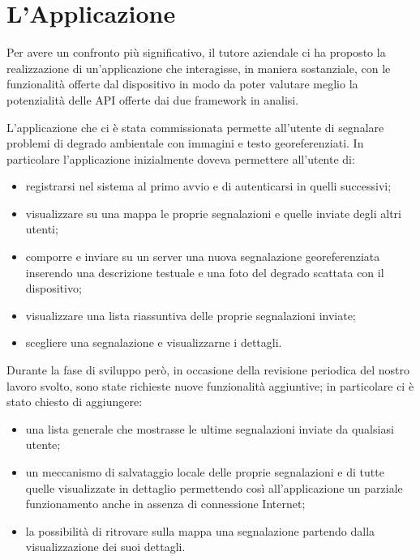 \chapter{L'Applicazione}
    Per avere un confronto più significativo, il tutore aziendale ci ha proposto
    la realizzazione di un'applicazione che interagisse, in maniera sostanziale,
    con le funzionalità offerte dal dispositivo in modo da poter valutare meglio
    la potenzialità delle API offerte dai due frame\-work in analisi.

    L'applicazione che ci è stata commissionata permette all'utente di segnalare
    problemi di degrado ambientale con immagini e testo georeferenziati.
    In particolare l'applicazione inizialmente doveva permettere all'utente di:
    \begin{itemize}
        \item registrarsi nel sistema al primo avvio e di autenticarsi in quelli
              successivi;
        \item visualizzare su una mappa le proprie segnalazioni e quelle inviate
              degli altri utenti;
        \item comporre e inviare su un server una nuova segnalazione
              georeferenziata inserendo una descrizione testuale e una foto del
              degrado scattata con il dispositivo;
        \item visualizzare una lista riassuntiva delle proprie segnalazioni
              inviate;
        \item scegliere una segnalazione e visualizzarne i dettagli.
    \end{itemize}
    Durante la fase di sviluppo però, in occasione della revisione periodica del
    nostro lavoro svolto, sono state richieste nuove funzionalità aggiuntive; in
    particolare ci è stato chiesto di aggiungere:
    \begin{itemize}
        \item una lista generale che mostrasse le ultime segnalazioni inviate da
              qualsiasi utente;
        \item un meccanismo di salvataggio locale delle proprie segnalazioni e
              di tutte quelle visualizzate in dettaglio permettendo così
              all'applicazione un parziale funzionamento anche in assenza di
              connessione Internet;
        \item la possibilità di ritrovare sulla mappa una segnalazione partendo
              dalla visualizzazione dei suoi dettagli.
    \end{itemize}

